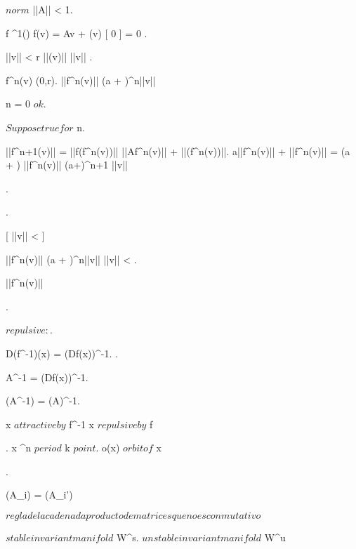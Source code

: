 \documentclass[../Main/main]{subfiles}
\begin{document}
{{{			 $ norm $ \suchthat ||A|| < 1.

			
			{
				f \in \Cc^1(\Uc)
				{
					f(v) = Av + \mu(v) \suchthat {}[ 0 ] = 0
				}
			}.

			\all{ \eta \in \R^+ }
			{
				{
					||v|| < r \imp ||\mu(v)|| \leq \eta||v||
				}
			}
			.

			{
				{
					f^n(v) \in \D(0,r).
					||f^n(v)|| \leq (a + \eta)^n||v||
				}
			}

			{
				n = 0 $ ok $.

				$Suppose true for $ n.

				||f^{n+1}(v)|| = ||f(f^n(v))|| \leq ||Af^n(v)|| + ||\mu(f^n(v))||.
				\leq a||f^n(v)|| + \eta||f^n(v)|| = (a + \eta) ||f^n(v)|| \leq (a+\eta)^{n+1} ||v||


			}.

			\all{ \epsilon \in \R^+ }
			{
				.

				[ ||v|| < \delta ]
				{
					||f^n(v)|| \leq (a + \eta)^n||v|| \leq ||v|| < \epsilon.

					||f^n(v)|| 
				}
			}.



			$repulsive:$.

			D(f^{-1})(x) = (Df(x))^{-1}.
			.

			A^{-1} = (Df(x))^{-1}.

			\sigma(A^{-1}) = \sigma(A)^{-1}.

			x $ attractive by $ f^{-1} \imp x $ repulsive by $ f
		}
	}
	
	
	{
		{
			.
			x \in \R^n $ period $ k $ point $.
			o(x) $ orbit of $ x
		}
		\holds
		{
			{
				.

				\sigma(A_i) = \sigma(A_{i'})
			}
		}
		\demonstration
		{
			$ regla de la cadena da producto de matrices que no es conmutativo $
		}
	}
	
	
	{
		{
		}
		{
		}
		{
		}
		\denote
		{
			$stable invariant manifold $ \as W^s.
			$unstable invariant manifold $ \as W^u
		}
	}
	
}
\end{document}
